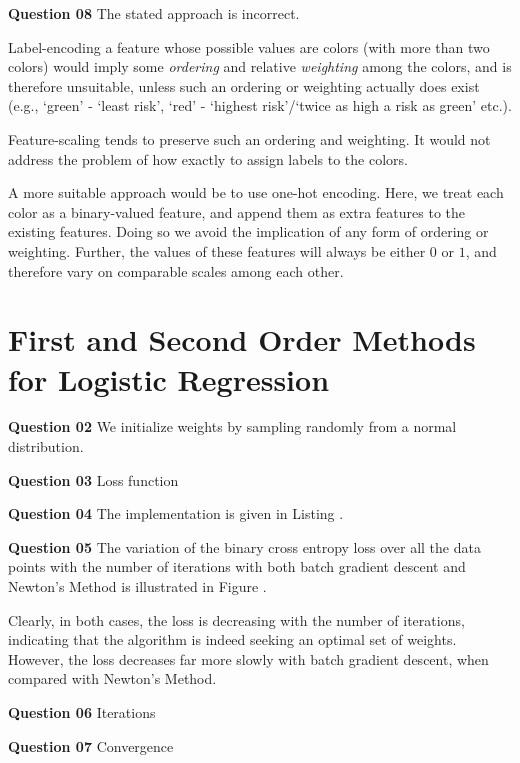 \documentclass{article}[a4paper]
\begin{document}
	\textbf{Question 08} The stated approach is incorrect.
	
	Label-encoding a feature whose possible values are colors (with more than two colors) would imply some \textit{ordering} and relative \textit{weighting} among the colors, and is therefore unsuitable, unless such an ordering or weighting actually does exist (e.g., `green' - `least risk', `red' - `highest risk'/`twice as high a risk as green' etc.).
	
	Feature-scaling tends to preserve such an ordering and weighting. It would not address the problem of how exactly to assign labels to the colors.

	A more suitable approach would be to use one-hot encoding. Here, we treat each color as a binary-valued feature, and append them as extra features to the existing features. Doing so we avoid the implication of any form of ordering or weighting. Further, the values of these features will always be either $0$ or $1$, and therefore vary on comparable scales among each other.

	\section{First and Second Order Methods for Logistic Regression}

	\textbf{Question 02} We initialize weights by sampling randomly from a normal distribution.
	\medskip

	\textbf{Question 03} Loss function
	\medskip

	\textbf{Question 04} The implementation is given in Listing .
	\medskip

	\textbf{Question 05} The variation of the binary cross entropy loss over all the data points with the number of iterations with both batch gradient descent and Newton's Method is illustrated in Figure .

	Clearly, in both cases, the loss is decreasing with the number of iterations, indicating that the algorithm is indeed seeking an optimal set of weights. However, the loss decreases far more slowly with batch gradient descent, when compared with Newton's Method.
	\medskip

	\textbf{Question 06} Iterations
	\medskip

	\textbf{Question 07} Convergence
\end{document}
